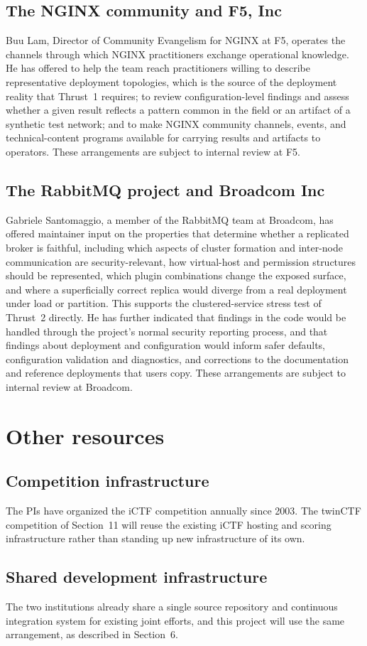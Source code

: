 \documentclass[11pt,letterpaper]{article}
\begin{document}
\subsection{The NGINX community and F5, Inc}
Buu Lam, Director of Community Evangelism for NGINX at F5, operates the
channels through which NGINX practitioners exchange operational knowledge. He
has offered to help the team reach practitioners willing to describe
representative deployment topologies, which is the source of the deployment
reality that Thrust~1 requires; to review configuration-level findings and
assess whether a given result reflects a pattern common in the field or an
artifact of a synthetic test network; and to make NGINX community channels,
events, and technical-content programs available for carrying results and
artifacts to operators. These arrangements are subject to internal review at
F5.

\subsection{The RabbitMQ project and Broadcom Inc}
Gabriele Santomaggio, a member of the RabbitMQ team at Broadcom, has offered
maintainer input on the properties that determine whether a replicated broker
is faithful, including which aspects of cluster formation and inter-node
communication are security-relevant, how virtual-host and permission
structures should be represented, which plugin combinations change the exposed
surface, and where a superficially correct replica would diverge from a real
deployment under load or partition. This supports the clustered-service stress
test of Thrust~2 directly. He has further indicated that findings in the code
would be handled through the project's normal security reporting process, and
that findings about deployment and configuration would inform safer defaults,
configuration validation and diagnostics, and corrections to the documentation
and reference deployments that users copy. These arrangements are subject to
internal review at Broadcom.

\section{Other resources}

\subsection{Competition infrastructure}
The PIs have organized the iCTF competition annually since 2003. The twinCTF
competition of Section~11 will reuse the existing iCTF hosting and scoring
infrastructure rather than standing up new infrastructure of its own.

\subsection{Shared development infrastructure}
The two institutions already share a single source repository and continuous
integration system for existing joint efforts, and this project will use the
same arrangement, as described in Section~6.
\end{document}
